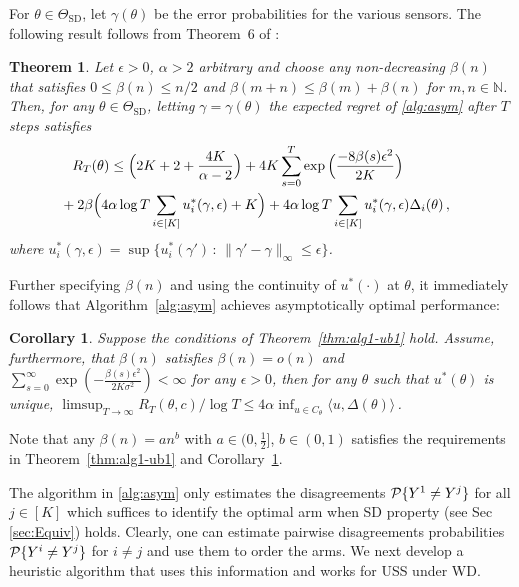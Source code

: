 \documentclass[11pt]{article} %
\newcommand{\todoc}[2][]{\todo[color=Apricot!20,size=\tiny,#1]{Cs: #2}}
\newcommand{\N}{\mathbb{N}}
\newcommand{\iset}[1]{[#1]}
\newcommand{\ip}[1]{\langle #1 \rangle} %
\newcommand{\SD}{\mathrm{SD}}
\newcommand{\TSD}{\Theta_{\SD}}
\newtheorem{thm}{Theorem}
\newtheorem{cor}{Corollary}
\begin{document}
\newcommand{\gap}{d}
\newcommand{\norm}[1]{\|#1\|}
For $\theta \in \TSD$, let $\gamma(\theta)$ be the error probabilities for the various sensors.
The following result follows from Theorem~6 of \cite{WGySz:NIPS15}:
\begin{thm} \label{thm:ftregret}
Let $\epsilon>0$, $\alpha>2$ arbitrary and choose any non-decreasing $\beta(n)$ that satisfies $0\le \beta(n)\le n/2$ and $\beta(m+n)\le \beta(m)+\beta(n)$ for $m,n\in \N$.
Then, 
for any
$\theta\in \TSD$, letting $\gamma = \gamma(\theta)$
the expected regret of \cref{alg:asym} after $T$ steps satisfies 
\begin{align*}
&R_T(\theta)
  \le  \Big( 2K+2+\frac{4K}{\alpha-2} \Big) 
  +  4K\sum_{s=0}^T \exp{\Big( \frac{-8\beta(s)\epsilon^2}{2K} \Big)}~~~~~ \\
 &\hspace{-.3cm} + 2 \beta\Big( 4\alpha\log T\sum_{i\in \iset{K}} u_i^*(\gamma,\epsilon)+K \Big)
  +  4\alpha\log T \sum_{i\in \iset{K}} u_i^*(\gamma,\epsilon)\Delta_i(\theta) \,,
\end{align*}
where $u_i^*(\gamma,\epsilon) = \sup\{u_i^*(\gamma')\,:\, \norm{\gamma'-\gamma}_{\infty}\le \epsilon \}$.
\label{thm:alg1-ub1}
\end{thm}  
Further specifying $\beta(n)$ and using the continuity of $u^*(\cdot)$ at $\theta$, it immediately follows that Algorithm~\ref{alg:asym} achieves asymptotically optimal performance: 
\begin{cor}
\label{cor:alg1-asym-opt}
 Suppose the conditions of Theorem~\ref{thm:alg1-ub1} hold. Assume, furthermore, that $\beta(n)$ satisfies $\beta(n) = o(n)$ and $\sum_{s=0}^\infty \exp \left( -\frac{\beta(s)\epsilon^2}{2K\sigma^2} \right)<\infty$ for any $\epsilon>0$, then for any $\theta$ such that $u^*(\theta)$ is unique, 
$
\limsup_{T\rightarrow \infty} R_T(\theta,c)/\log T \le 4\alpha \inf_{u\in C_\theta} \ip{u,\Delta(\theta)}\,$.
\end{cor}
Note that any $\beta(n) = an^b$ with $a\in (0,\frac{1}{2}]$, $b\in (0,1)$ satisfies the requirements in Theorem~\ref{thm:alg1-ub1} and Corollary~\ref{cor:alg1-asym-opt}.




The algorithm in \ref{alg:asym} only estimates the disagreements $\P\{Y^1 \neq Y^j\}$ for all $j \in [K]$ which suffices to identify the optimal arm when SD property (see Sec \ref{sec:Equiv}) holds. Clearly, one can estimate pairwise disagreements probabilities $\P\{Y^i \neq Y^j\}$ for $i\neq j$ and use them to order the arms. We next develop a heuristic algorithm that uses this information and works for USS under WD. 
\end{document}
